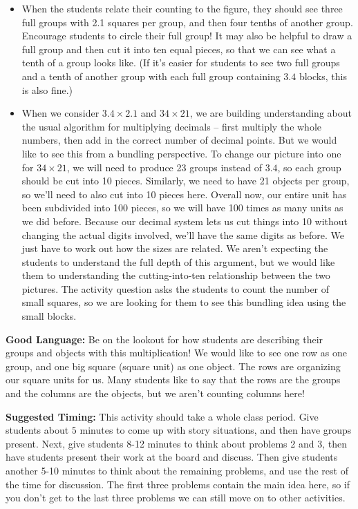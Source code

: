 \documentclass{ximera}
\begin{document}
\begin{instructorNotes}
\begin{itemize}
	\item When the students relate their counting to the figure, they should see three full groups with 2.1 squares per group, and then four tenths of another group. Encourage students to circle their full group! It may also be helpful to draw a full group and then cut it into ten equal pieces, so that we can see what a tenth of a group looks like. (If it's easier for students to see two full groups and a tenth of another group with each full group containing $3.4$ blocks, this is also fine.)
	\item When we consider $3.4 \times 2.1$ and $34 \times 21$, we are building understanding about the usual algorithm for multiplying decimals -- first multiply the whole numbers, then add in the correct number of decimal points. But we would like to see this from a bundling perspective. To change our picture into one for $34 \times 21$, we will need to produce 23 groups instead of $3.4$, so each group should be cut into 10 pieces. Similarly, we need to have 21 objects per group, so we'll need to also cut into 10 pieces here. Overall now, our entire unit has been subdivided into 100 pieces, so we will have 100 times as many units as we did before. Because our decimal system lets us cut things into 10 without changing the actual digits involved, we'll have the same digits as before. We just have to work out how the sizes are related. We aren't expecting the students to understand the full depth of this argument, but we would like them to understanding the cutting-into-ten relationship between the two pictures. The activity question asks the students to count the number of small squares, so we are looking for them to see this bundling idea using the small blocks.
\end{itemize}

{\bf Good Language:} Be on the lookout for how students are describing their groups and objects with this multiplication! We would like to see one row as one group, and one big square (square unit) as one object. The rows are organizing our square units for us. Many students like to say that the rows are the groups and the columns are the objects, but we aren't counting columns here!

{\bf Suggested Timing:} This activity should take a whole class period. Give students about $5$ minutes to come up with story situations, and then have groups present. Next, give students 8-12 minutes to think about problems 2 and 3, then have students present their work at the board and discuss. Then give students another 5-10 minutes to think about the remaining problems, and use the rest of the time for discussion. The first three problems contain the main idea here, so if you don't get to the last three problems we can still move on to other activities.


\end{instructorNotes}
\end{document}
